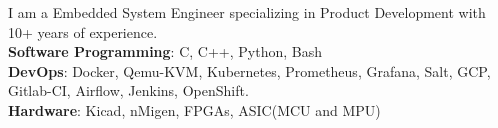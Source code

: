
\begin{cvparagraph}
    I am a Embedded System Engineer specializing in Product Development with 10+ years of experience.\\
\textbf{Software Programming}:  C, C++, Python, Bash\\
\textbf{DevOps}:  Docker, Qemu-KVM, Kubernetes, Prometheus, Grafana, Salt, GCP, Gitlab-CI, Airflow, Jenkins, OpenShift.\\
\textbf{Hardware}:  Kicad, nMigen, FPGAs, ASIC(MCU and MPU)\\
\end{cvparagraph}



